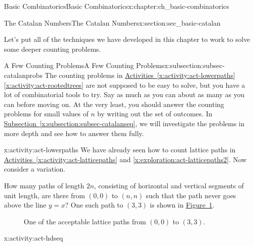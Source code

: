 \documentclass[oneside,10pt,]{book}
\numberwithin{equation}{chapter}
\begin{document}
\begin{chapterptx}{Basic Combinatorics}{}{Basic Combinatorics}{}{}{x:chapter:ch_basic-combinatorics}
\begin{sectionptx}{The Catalan Numbers}{}{The Catalan Numbers}{}{}{x:section:sec_basic-catalan}
\begin{introduction}{}%
Let's put all of the techniques we have developed in this chapter to work to solve some deeper counting problems.%
\end{introduction}%
%
%
\typeout{************************************************}
\typeout{************************************************}
%
\begin{subsectionptx}{A Few Counting Problems}{}{A Few Counting Problems}{}{}{x:subsection:subsec-catalanprobs}
The counting problems in \hyperref[x:activity:act-lowerpaths]{Activities~\ref{x:activity:act-lowerpaths}\textendash{}\ref{x:activity:act-rootedtrees}} are not supposed to be easy to solve, but you have a lot of combinatorial tools to try.  Say as much as you can about as many as you can before moving on.  At the very least, you should answer the counting problems for small values of \(n\) by writing out the set of outcomes.  In \hyperref[x:subsection:subsec-catalanseq]{Subsection~\ref{x:subsection:subsec-catalanseq}}, we will investigate the problems in more depth and see how to answer them fully.%
\begin{activity}{}{x:activity:act-lowerpaths}%
We have already seen how to count lattice paths in \hyperref[x:activity:act-latticepaths]{Activities~\ref{x:activity:act-latticepaths}} and \hyperref[x:exploration:act-latticepaths2]{\ref{x:exploration:act-latticepaths2}}.  Now consider a variation.%
\par
How many paths of length \(2n\), consisting of horizontal and vertical segments of unit length, are there from \((0, 0)\) to \((n, n)\) such that the path never goes above the line \(y = x\)? One such path to \((3, 3)\) is shown in \hyperref[x:figure:catalanpathex]{Figure~\ref{x:figure:catalanpathex}}.%
\begin{figure}
\centering
{
}
\caption{One of the acceptable lattice paths from \((0,0)\) to \((3,3)\).\label{x:figure:catalanpathex}}
\end{figure}
\end{activity}
\begin{activity}{}{x:activity:act-hdseq}%

\end{activity}
\end{subsectionptx}
\end{sectionptx}
\end{chapterptx}
\end{document}
